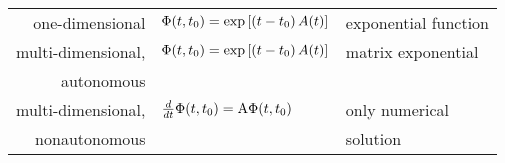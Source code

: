 \begin{center}
	\begin{tabular}{rll}
	one-dimensional & $\mathbf{\mathrm{\Phi}}(t,t_0) = \exp\left[(t-t_0)\,A(t)\right]$ & exponential function\\
	
	multi-dimensional, & $\mathbf{\mathrm{\Phi}}(t,t_0) = \exp\left[(t-t_0)\,A(t)\right]$ & matrix exponential \\
	autonomous\\
	
	multi-dimensional, & $ \frac{d}{dt} \mathbf{\mathrm{\Phi}}(t,t_0)=\mathbf{\mathrm{A}} \mathbf{\mathrm{\Phi}}(t,t_0)$& only numerical\\
	nonautonomous && solution
	\end{tabular}
\end{center}

